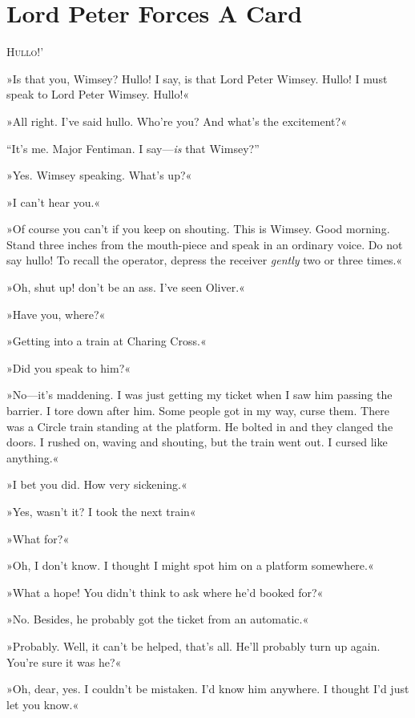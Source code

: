 \chapter{Lord Peter Forces A Card}

\lettrine[lines=4,ante=‘]{H}{ullo}!' 

\zz
»Is that you, Wimsey? Hullo! I say, is that Lord Peter Wimsey. Hullo! I must speak to Lord Peter Wimsey. Hullo!« 

\zz
»All right. I've said hullo. Who're you? And what's the excitement?«

\enquote{It's me. Major Fentiman. I say---\textit{is} that Wimsey?}

»Yes. Wimsey speaking. What's up?«

»I can't hear you.«

»Of course you can't if you keep on shouting. This is Wimsey. Good morning. Stand three inches from the mouth-piece and speak in an ordinary voice. Do not say hullo! To recall the operator, depress the receiver \textit{gently} two or three times.«

»Oh, shut up! don't be an ass. I've seen Oliver.«

»Have you, where?«

»Getting into a train at Charing Cross.«

»Did you speak to him?«

»No\allowbreak---\allowbreak it's maddening. I was just getting my ticket when I saw him passing the barrier. I tore down after him. Some people got in my way, curse them. There was a Circle train standing at the platform. He bolted in and they clanged the doors. I rushed on, waving and shouting, but the train went out. I cursed like anything.«

»I bet you did. How very sickening.«

»Yes, wasn't it? I took the next train\longdash«

»What for?«

»Oh, I don't know. I thought I might spot him on a platform somewhere.«

»What a hope! You didn't think to ask where he'd booked for?«

»No. Besides, he probably got the ticket from an automatic.«

»Probably. Well, it can't be helped, that's all. He'll probably turn up again. You're sure it was he?«

»Oh, dear, yes. I couldn't be mistaken. I'd know him anywhere. I thought I'd just let you know.«

